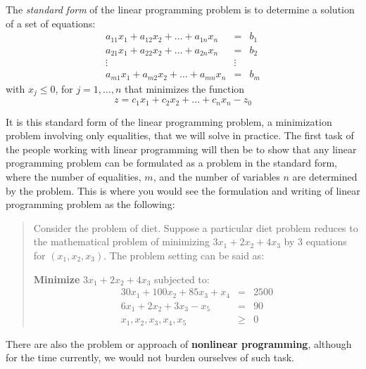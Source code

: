 \begin{definition}
    The \textit{standard form} of the linear programming problem is to determine a solution of a set of equations:
    \begin{equation}
        \begin{matrix}
            a_{11}x_1 + a_{12}x_{2} + \dots + a_{1n}x_{n} & = & b_{1}\\
            a_{21}x_1 + a_{22}x_{2} + \dots + a_{2n}x_{n} & = & b_{2}\\
            \vdots & \vdots & \\
            a_{m1}x_1 + a_{m2}x_{2} + \dots + a_{mn}x_{n} & = & b_{m}
        \end{matrix}
    \end{equation}
    with $x_{j}\leq 0$, for $j=1,\dots,n$ that minimizes the function 
    \begin{equation}
        z = c_{1}x_{1} + c_{2}x_{2} + \dots + c_{n}x_{n} - z_{0}
    \end{equation}
\end{definition}

It is this standard form of the linear programming problem, a minimization problem involving only equalities, that we will solve in practice. The first task of the people working with linear programming will then be to show that any linear programming problem can be formulated as a problem in the standard form, where the number of equalities, $m$, and the number of variables $n$ are determined by the problem. This is where you would see the formulation and writing of linear programming problem as the following: 
\begin{quote}
    Consider the problem of diet. Suppose a particular diet problem reduces to the mathematical problem of minimizing $3x_{1}+2x_{2}+4x_{3}$ by 3 equations for $(x_{1},x_{2},x_{3})$. The problem setting can be said as: 
    \vspace{2mm}

    \textbf{Minimize} $3x_{1}+2x_{2}+4x_{3}$ subjected to: 
    \begin{equation*}
        \begin{matrix}
            30x_{1} + 100x_{2} + 85x_{3} + x_{4} & = & 2500\\
            6x_{1} + 2x_{2} + 3x_{3} - x_{5} & = & 90 \\
            x_{1}, x_{2}, x_{3},x_{4},x_{5} & \geq & 0
        \end{matrix}
    \end{equation*}
\end{quote}
There are also the problem or approach of \textbf{nonlinear programming}, although for the time currently, we would not burden ourselves of such task. 


